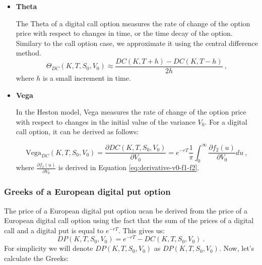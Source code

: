\begin{itemize}
\item \textbf{Theta} 

The Theta of a digital call option measures the rate of change of the option price with respect to changes in time, or the time decay of the option. Similary to the call option case, we approximate it using the central difference method. 
$$
 \Theta_{DC}(K,T,S_0,V_0) \approx \frac{DC(K,T+h) - DC(K,T-h)}{2h} \  ,
$$
where $h$ is a small increment in time. 


\item \textbf{Vega} 

In the Heston model, Vega measures the rate of change of the option price with respect to changes in the initial value of the variance $V_0$. For a digital call option, it can be derived as follows:

$$
\text{Vega}_{DC}(K,T,S_0,V_0) = \frac{\partial DC(K,T, S_0, V_0)}{\partial V_0} = e^{-r T}   \frac{1}{\pi}\int_0^{\infty}\frac{\partial f_2(u)}{\partial V_0} du \ ,
$$
where $\frac{\partial f_2(u)}{\partial V_0}$ is derived in Equation \ref{eq:derivative-v0-f1-f2}.


\end{itemize}













\subsubsection{Greeks of a European digital put option}

The price of a European digital put option ucan be derived from the price of a European digital call option using the fact that the sum of the prices of a digital call and a digital put is equal to $e^{-rT}$. This gives us:
$$
DP(K,T, S_0, V_0) = e^{-rT} - DC(K,T,  S_0, V_0) \ .
$$
For simplicity we will denote $DP(K,T, S_0, V_0)$ as $DP(K,T,S_0,V_0)$.
Now, let's calculate the Greeks:

